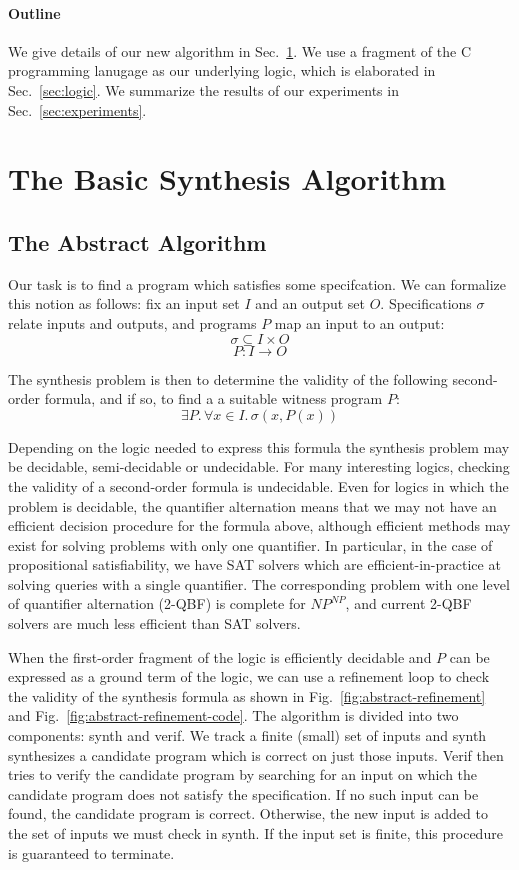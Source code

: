 \documentclass[a4paper]{llncs}
\begin{document}
\paragraph{Outline} We give details of our new algorithm in
Sec.~\ref{sec:algorithm}.  We use a fragment of the C programming lanugage
as our underlying logic, which is elaborated in Sec.~\ref{sec:logic}. We
summarize the results of our experiments in Sec.~\ref{sec:experiments}.

\section{The Basic Synthesis Algorithm}
\label{sec:algorithm}

\subsection{The Abstract Algorithm}

Our task is to find a program which satisfies some specifcation.  We can formalize this
notion as follows: fix an input set $I$ and an output set $O$.  Specifications $\sigma$
relate inputs and outputs, and programs $P$ map an input to an output:
%
$$ \sigma \subseteq I \times O $$
$$ P : I \rightarrow O$$

The synthesis problem is then to determine the validity of the following
second-order formula, and if so, to find a a suitable witness program $P$:
%
$$\exists P .\, \forall x \in I.\, \sigma(x, P(x))$$

Depending on the logic needed to express this formula the synthesis problem
may be decidable, semi-decidable or undecidable.  For many interesting
logics, checking the validity of a second-order formula is undecidable. 
Even for logics in which the problem is decidable, the quantifier
alternation means that we may not have an efficient decision procedure for
the formula above, although efficient methods may exist for solving problems
with only one quantifier.  In particular, in the case of propositional
satisfiability, we have SAT solvers which are efficient-in-practice at
solving queries with a single quantifier.  The corresponding problem with
one level of quantifier alternation (2-QBF) is complete for $NP^{NP}$, and
current 2-QBF solvers are much less efficient than SAT solvers.

When the first-order fragment of the logic is efficiently decidable and $P$ can be
expressed as a ground term of the logic, we can use a refinement loop to check the
validity of the synthesis formula as shown in Fig.~\ref{fig:abstract-refinement} and
Fig.~\ref{fig:abstract-refinement-code}.  The algorithm is divided into two
components: {\sc synth} and {\sc verif}.  We track a finite (small) set of inputs
and {\sc synth} synthesizes a candidate program which is correct on just those inputs.
{\sc Verif} then tries to verify the candidate program by searching for an input on
which the candidate program does not satisfy the specification.  If no such input
can be found, the candidate program is correct.  Otherwise, the new input is added
to the set of inputs we must check in {\sc synth}.  If the input set is finite, this
procedure is guaranteed to terminate.
\end{document}
